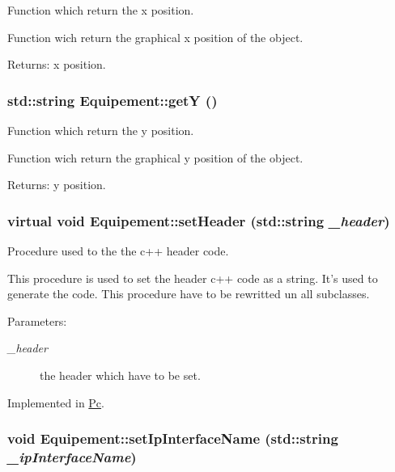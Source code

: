 Function which return the x position. 

Function wich return the graphical x position of the object.

\begin{Desc}
\item[Returns:]x position. \end{Desc}
\hypertarget{class_equipement_a3b627e52bd5bfddadd665ffbf88cbd4}{
\subsubsection[{getY}]{\setlength{\rightskip}{0pt plus 5cm}std::string Equipement::getY ()}}
\label{class_equipement_a3b627e52bd5bfddadd665ffbf88cbd4}


Function which return the y position. 

Function wich return the graphical y position of the object.

\begin{Desc}
\item[Returns:]y position. \end{Desc}
\hypertarget{class_equipement_9068d14ff2c67d06be75a21ebc9fbcd7}{
\subsubsection[{setHeader}]{\setlength{\rightskip}{0pt plus 5cm}virtual void Equipement::setHeader (std::string {\em \_\-header})}}
\label{class_equipement_9068d14ff2c67d06be75a21ebc9fbcd7}


Procedure used to the the c++ header code. 

This procedure is used to set the header c++ code as a string. It's used to generate the code. This procedure have to be rewritted un all subclasses.

\begin{Desc}
\item[Parameters:]
\begin{description}
\item[{\em \_\-header}]the header which have to be set. \end{description}
\end{Desc}


Implemented in \hyperlink{class_pc_8049628cd139b39cbae2327e70ca0eb7}{Pc}.\hypertarget{class_equipement_cea2da7dead8d0b74c90933c422211c4}{
\subsubsection[{setIpInterfaceName}]{\setlength{\rightskip}{0pt plus 5cm}void Equipement::setIpInterfaceName (std::string {\em \_\-ipInterfaceName})}}
\label{class_equipement_cea2da7dead8d0b74c90933c422211c4}


